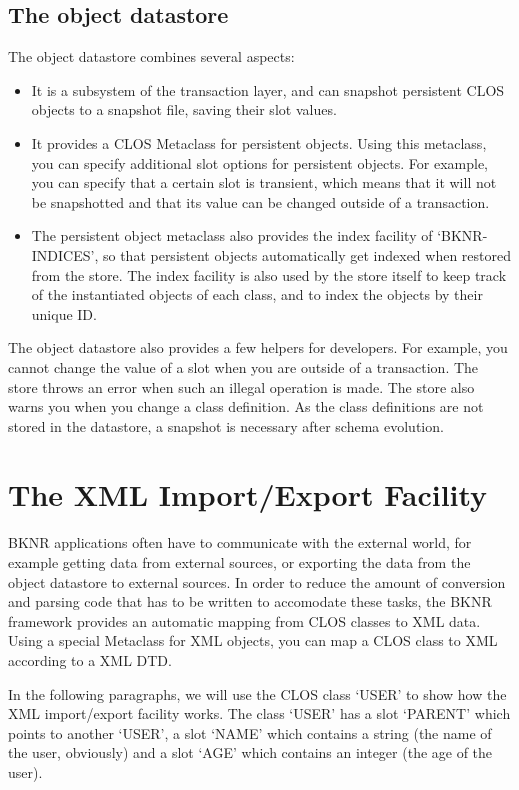\subsection{The object datastore}

The object datastore combines several aspects:
\begin{itemize}
  \item It is a subsystem of the transaction layer, and can snapshot
persistent CLOS objects to a snapshot file, saving their slot values.
  \item It provides a CLOS Metaclass for persistent objects. Using
this metaclass, you can specify additional slot options for persistent
objects. For example, you can specify that a certain slot is
transient, which means that it will not be snapshotted and that its
value can be changed outside of a transaction.
  \item The persistent object metaclass also provides the index
facility of `BKNR-INDICES', so that persistent objects automatically
get indexed when restored from the store. The index facility is also
used by the store itself to keep track of the instantiated objects of
each class, and to index the objects by their unique ID.
\end{itemize}

The object datastore also provides a few helpers for developers. For
example, you cannot change the value of a slot when you are outside of
a transaction. The store throws an error when such an illegal
operation is made. The store also warns you when you change a class
definition. As the class definitions are not stored in the datastore,
a snapshot is necessary after schema evolution.

\section{The XML Import/Export Facility}

BKNR applications often have to communicate with the external world,
for example getting data from external sources, or exporting the data
from the object datastore to external sources. In order to reduce the
amount of conversion and parsing code that has to be written to
accomodate these tasks, the BKNR framework provides an automatic
mapping from CLOS classes to XML data. Using a special Metaclass for
XML objects, you can map a CLOS class to XML according to a XML
DTD.

In the following paragraphs, we will use the CLOS class `USER' to show
how the XML import/export facility works. The class `USER' has a slot
`PARENT' which points to another `USER', a slot `NAME' which contains
a string (the name of the user, obviously) and a slot `AGE' which
contains an integer (the age of the user).

